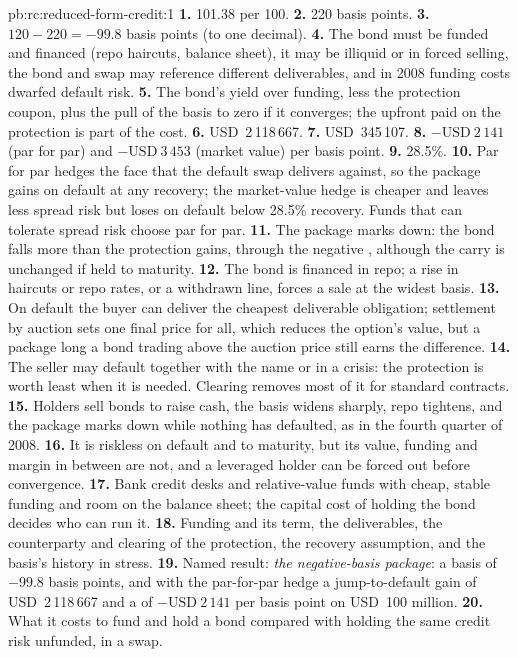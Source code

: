 \begin{solution}{pb:rc:reduced-form-credit:1}
\textbf{1.} 101.38 per 100.
\textbf{2.} 220 basis points.
\textbf{3.} $120-220 = -99.8$ basis points (to one decimal).
\textbf{4.} The bond must be funded and financed (repo haircuts, balance sheet), it may be
illiquid or in forced selling, the bond and swap may reference different deliverables,
and in 2008 funding costs dwarfed default risk.
\textbf{5.} The bond's yield over funding, less the protection coupon, plus the pull of the
basis to zero if it converges; the upfront paid on the protection is part of the cost.
\textbf{6.} USD~2\,118\,667.
\textbf{7.} USD~345\,107.
\textbf{8.} $-\text{USD}~2\,141$ (par for par) and $-\text{USD}~3\,453$ (market value) per basis
point.
\textbf{9.} 28.5\%.
\textbf{10.} Par for par hedges the face that the default swap delivers against, so the
package gains on default at any recovery; the market-value hedge is cheaper and leaves
less spread risk but loses on default below 28.5\% recovery. Funds that can tolerate
spread risk choose par for par.
\textbf{11.} The package marks down: the bond falls more than the protection gains,
through the negative , although the carry is unchanged if held to maturity.
\textbf{12.} The bond is financed in repo; a rise in haircuts or repo rates, or a withdrawn
line, forces a sale at the widest basis.
\textbf{13.} On default the buyer can deliver the cheapest deliverable obligation; settlement
by auction sets one final price for all, which reduces the option's value, but a package
long a bond trading above the auction price still earns the difference.
\textbf{14.} The seller may default together with the name or in a crisis: the protection is
worth least when it is needed. Clearing removes most of it for standard contracts.
\textbf{15.} Holders sell bonds to raise cash, the basis widens sharply, repo tightens, and the
package marks down while nothing has defaulted, as in the fourth quarter of 2008.
\textbf{16.} It is riskless on default and to maturity, but its value, funding and margin in
between are not, and a leveraged holder can be forced out before convergence.
\textbf{17.} Bank credit desks and relative-value funds with cheap, stable funding and room on
the balance sheet; the capital cost of holding the bond decides who can run it.
\textbf{18.} Funding and its term, the deliverables, the counterparty and clearing of the
protection, the recovery assumption, and the basis's history in stress.
\textbf{19.} Named result: \emph{the negative-basis package}: a basis of $-99.8$ basis points,
and with the par-for-par hedge a jump-to-default gain of USD~2\,118\,667 and a  of
$-\text{USD}~2\,141$ per basis point on USD~100 million.
\textbf{20.} What it costs to fund and hold a bond compared with holding the same credit risk
unfunded, in a swap.
\end{solution}

